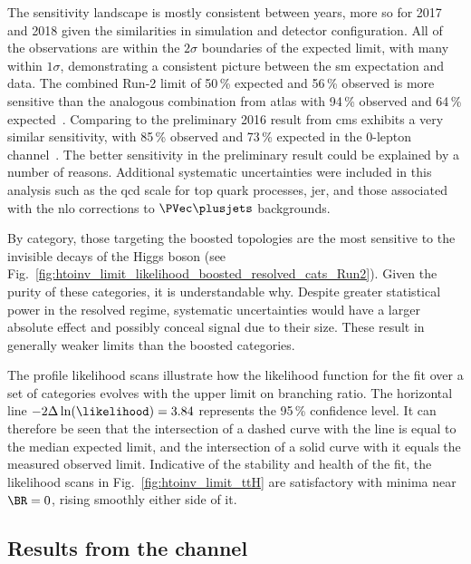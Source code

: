 The sensitivity landscape is mostly consistent between years, more so for 2017 and 2018 given the similarities in simulation and detector configuration. All of the observations are within the $\text{2}\sigma$ boundaries of the expected limit, with many within $\text{1}\sigma$, demonstrating a consistent picture between the \acrshort{sm} expectation and data. The combined Run-2 limit of 50\,\% expected and 56\,\% observed is more sensitive than the analogous combination from \acrshort{atlas} with 94\,\% observed and 64\,\% expected~\cite{ATLAS:2020kdi}. Comparing to the preliminary 2016 result from \acrshort{cms} exhibits a very similar sensitivity, with 85\,\% observed and 73\,\% expected in the 0-lepton channel~\cite{CMS-PAS-HIG-18-008}. The better sensitivity in the preliminary result could be explained by a number of reasons. Additional systematic uncertainties were included in this analysis such as the \acrshort{qcd} scale for top quark processes, \acrlong{jer}, and those associated with the \acrshort{nlo} corrections to $\PVec \plusjets$ backgrounds.

By category, those targeting the boosted topologies are the most sensitive to the invisible decays of the Higgs boson (see Fig.~\ref{fig:htoinv_limit_likelihood_boosted_resolved_cats_Run2}). Given the purity of these categories, it is understandable why. Despite greater statistical power in the resolved regime, systematic uncertainties would have a larger absolute effect and possibly conceal signal due to their size. These result in generally weaker limits than the boosted categories.

The profile likelihood scans illustrate how the likelihood function for the fit over a set of categories evolves with the upper limit on branching ratio. The horizontal line $-\text{2}\Delta \ln(\likelihood) = \text{3.84}$ represents the 95\,\% confidence level. It can therefore be seen that the intersection of a dashed curve with the line is equal to the median expected limit, and the intersection of a solid curve with it equals the measured observed limit. Indicative of the stability and health of the fit, the likelihood scans in Fig.~\ref{fig:htoinv_limit_ttH} are satisfactory with minima near $\BR = \text{0}$, rising smoothly either side of it.




\subsection{Results from the \texorpdfstring{\VH}{VH} channel}
\label{subsec:htoinv_results_VH}

